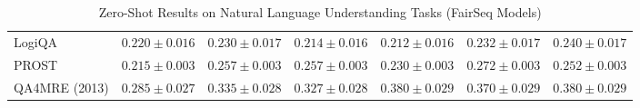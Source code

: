 \documentclass[11pt]{article}
\begin{document}
{\begin{landscape}
\begin{table}
\begin{tabular}{l c c c c c c }
LogiQA & $0.220 \pm 0.016$ & $0.230 \pm 0.017$ & $0.214 \pm 0.016$ & $0.212 \pm 0.016$ & $0.232 \pm 0.017$ & $0.240 \pm 0.017$ \\ 
PROST & $0.215 \pm 0.003$ & $0.257 \pm 0.003$ & $0.257 \pm 0.003$ & $0.230 \pm 0.003$ & $0.272 \pm 0.003$ & $0.252 \pm 0.003$ \\ 
QA4MRE (2013) & $0.285 \pm 0.027$ & $0.335 \pm 0.028$ & $0.327 \pm 0.028$ & $0.380 \pm 0.029$ & $0.370 \pm 0.029$ & $0.380 \pm 0.029$ \\\bottomrule
\end{tabular}
\caption{Zero-Shot Results on Natural Language Understanding Tasks (FairSeq Models)}
\label{tab:nlu_fairseq}
\end{table}



\end{landscape}}
\end{document}
